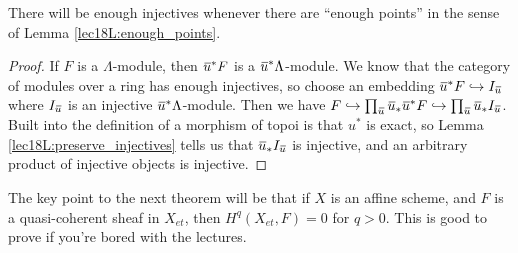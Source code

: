  There will be enough injectives whenever there are ``enough points'' in the
 sense of Lemma \ref{lec18L:enough_points}.
 \begin{proof}
   If $F$ is a $\Lambda$-module, then $\bbar u^* F$ is a $\bbar u^* \Lambda$-module. We
   know that the category of modules over a ring has enough injectives, so choose an
   embedding $\bbar u^* F\hookrightarrow I_{\bbar u}$ where $I_{\bbar u}$ is an injective
   $\bbar u^* \Lambda$-module. Then we have $F\hookrightarrow \prod_{\bbar u} \bbar
   u_*\bbar u^* F\hookrightarrow \prod_{\bbar u} \bbar u_* I_{\bbar u}$. Built into the
   definition of a morphism of topoi is that $u^*$ is exact, so Lemma
   \ref{lec18L:preserve_injectives} tells us that $\bbar u_* I_{\bbar u}$ is injective,
   and an arbitrary product of injective objects is injective.
 \end{proof}
 The key point to the next theorem will be that if $X$ is an affine scheme, and $F$ is a
 quasi-coherent sheaf in $X_{et}$, then $H^q(X_{et},F)=0$ for $q>0$. This is good to
 prove if you're bored with the lectures.
